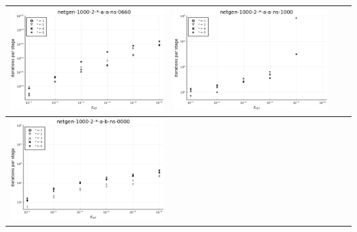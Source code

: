 \documentclass{article}
\begin{document}
\begin{landscape}
\begin{center}
\begin{longtable}{| c | c | c | c |}
\includegraphics[height=0.22\textheight]{itepst_fixlim_netgen-1000-2-_-a-a-ns-0660.png} &
\includegraphics[height=0.22\textheight]{itepst_fixlim_netgen-1000-2-_-a-a-ns-1000.png} \\
                \hline
\includegraphics[height=0.22\textheight]{itepst_fixlim_netgen-1000-2-_-a-b-ns-0000.png} &

\end{longtable}
\end{center}
\end{landscape}
\end{document}
